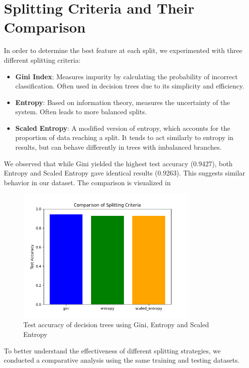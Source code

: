 \documentclass[11pt]{article}
\begin{document}
\section{Splitting Criteria and Their Comparison}

In order to determine the best feature at each split, we experimented with three different splitting criteria:

\begin{itemize}
    \item \textbf{Gini Index}: Measures impurity by calculating the probability of incorrect classification. Often used in decision trees due to its simplicity and efficiency.
    \item \textbf{Entropy}: Based on information theory, measures the uncertainty of the system. Often leads to more balanced splits.
    \item \textbf{Scaled Entropy}: A modified version of entropy, which accounts for the proportion of data reaching a split. It tends to act similarly to entropy in results, but can behave differently in trees with imbalanced branches.
\end{itemize}

We observed that while Gini yielded the highest test accuracy (0.9427), both Entropy and Scaled Entropy gave identical results (0.9263). This suggests similar behavior in our dataset. The comparison is visualized in \begin{figure}[H]
    \centering
    \includegraphics[width=0.8\textwidth]{criteria_comparison.png}
    \caption{Test accuracy of decision trees using Gini, Entropy and Scaled Entropy}
    \label{fig:split_criteria}
\end{figure}

To better understand the effectiveness of different splitting strategies, we conducted a comparative analysis using the same training and testing datasets.
\end{document}
